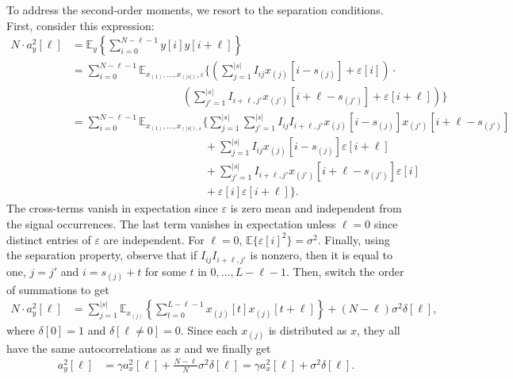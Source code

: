 \documentclass[12pt]{article}
\newcommand{\E}{\mathbb{E}}
\newcommand{\1}{\mathbf{1}}
\theoremstyle{plain}
\theoremstyle{definition}
\theoremstyle{remark}
\theoremstyle{plain}
\theoremstyle{remark}
\theoremstyle{plain}
\theoremstyle{plain}
\theoremstyle{plain}
\numberwithin{equation}{section}
\begin{document}
To address the second-order moments, we resort to the separation conditions. First, consider this expression:
\begin{align*}
N \cdot a_y^2[\ell] & = \E_y\left\{ \sum_{i = 0}^{N-\ell-1} y[i] y[i+\ell] \right\} \\
& = \sum_{i = 0}^{N-\ell-1} \E_{x_{(1)}, \ldots, x_{(|s|)}, \varepsilon}\Bigg\{ \left( \sum_{j = 1}^{|s|} I_{ij} x_{(j)}[i-s_{(j)}] + \varepsilon[i] \right) \cdot \\
& \qquad \qquad \qquad \qquad \qquad  \left( \sum_{j' = 1}^{|s|} I_{i+\ell,j'} x_{(j')}[i+\ell-s_{(j')}] + \varepsilon[i+\ell] \right)  \Bigg\} \\
& = \sum_{i = 0}^{N-\ell-1} \E_{x_{(1)}, \ldots, x_{(|s|), \varepsilon}}\Bigg\{ \sum_{j = 1}^{|s|} \sum_{j' = 1}^{|s|} I_{ij}  I_{i+\ell,j'} x_{(j)}[i-s_{(j)}]  x_{(j')}[i+\ell-s_{(j')}] \\
& \qquad \qquad \qquad \qquad \qquad \qquad + \sum_{j = 1}^{|s|} I_{ij} x_{(j)}[i-s_{(j)}] \varepsilon[i+\ell] \\
& \qquad \qquad \qquad \qquad \qquad \qquad + \sum_{j' = 1}^{|s|} I_{i+\ell,j'} x_{(j')}[i+\ell-s_{(j')}] \varepsilon[i] \\
& \qquad \qquad \qquad \qquad \qquad \qquad + \varepsilon[i] \varepsilon[i + \ell] \Bigg\}.
\end{align*}
The cross-terms vanish in expectation since $\varepsilon$ is zero mean and independent from the signal occurrences. The last term vanishes in expectation unless $\ell = 0$ since distinct entries of $\varepsilon$ are independent. For $\ell = 0$, $\E\{\varepsilon[i]^2\} = \sigma^2$. Finally, using the separation property, observe that if $I_{ij}  I_{i+\ell,j'}$ is nonzero, then it is equal to one, $j = j'$ and $i = s_{(j)} + t$ for some $t$ in $0, \ldots, L-\ell-1$. Then, switch the order of summations to get
\begin{align}
N \cdot a_y^2[\ell] & = \sum_{j=1}^{|s|} \E_{x_{(j)}}\left\{ \sum_{t = 0}^{L-\ell-1} x_{(j)}[t] x_{(j)}[t+\ell] \right\} + (N-\ell)\sigma^2 \delta[\ell],
\end{align}
where $\delta[0] = 1$ and $\delta[\ell \neq 0] = 0$. Since each $x_{(j)}$ is distributed as $x$, they all have the same autocorrelations as $x$ and we finally get
\begin{align}
a_y^2[\ell] & = \gamma a_x^2[\ell] + \frac{N-\ell}{N}\sigma^2 \delta[\ell] = \gamma a_x^2[\ell] + \sigma^2 \delta[\ell].
\end{align}
\end{document}

